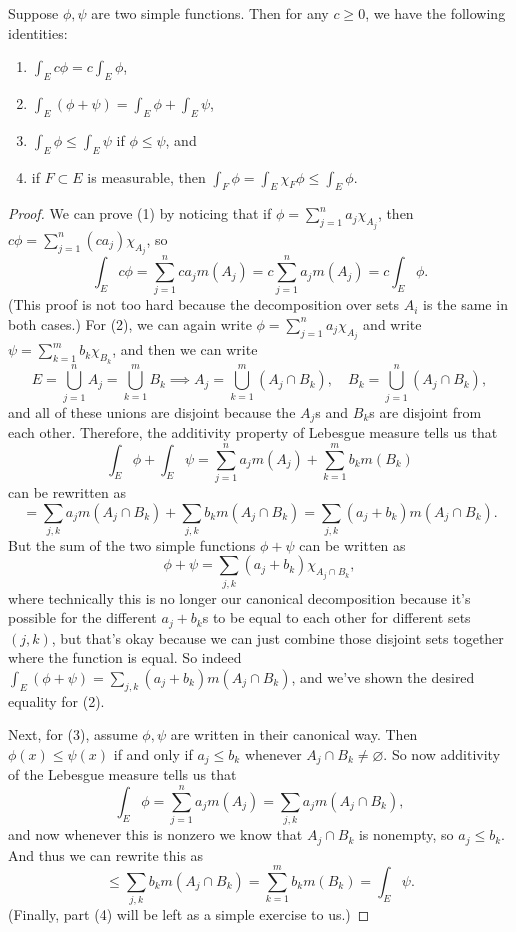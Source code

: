 \begin{theorem}
Suppose $\phi, \psi$ are two simple functions. Then for any $c \ge 0$, we have the following identities:
\begin{enumerate}
\item $\int_E c\phi = c \int_E \phi$,
\item $\int_E (\phi + \psi) = \int_E \phi + \int_E \psi$,
\item $\int_E \phi \le \int_E \psi$ if $\phi \le \psi$, and
\item if $F \subset E$ is measurable, then $\int_F \phi = \int_E \chi_F \phi \le \int_E \phi$.
\end{enumerate}
\end{theorem}
\begin{proof}
We can prove (1) by noticing that if $\phi = \sum_{j=1}^n a_j \chi_{A_j}$, then $c\phi = \sum_{j=1}^n (ca_j)\chi_{A_j}$, so 
\[
    \int_E c\phi = \sum_{j=1}^n ca_j m(A_j) = c \sum_{j=1}^n a_j m(A_j) = c \int_E \phi.
\]  
(This proof is not too hard because the decomposition over sets $A_i$ is the same in both cases.) For (2), we can again write $\phi = \sum_{j=1}^n a_j \chi_{A_j}$ and write $\psi = \sum_{k=1}^m b_k \chi_{B_k}$, and then we can write 
\[
    E = \bigcup_{j=1}^n A_j = \bigcup_{k=1}^m B_k \implies A_j = \bigcup_{k=1}^m (A_j \cap B_k), \quad B_k = \bigcup_{j=1}^n (A_j \cap B_k),
\]
and all of these unions are disjoint because the $A_j$s and $B_k$s are disjoint from each other. Therefore, the additivity property of Lebesgue measure tells us that 
\[
    \int_E \phi + \int_E \psi = \sum_{j=1}^n a_j m(A_j) + \sum_{k=1}^m b_k m(B_k)
\]
can be rewritten as 
\[
    = \sum_{j, k} a_j m(A_j \cap B_k) + \sum_{j, k} b_k m(A_j \cap B_k) = \sum_{j, k} (a_j + b_k) m(A_j \cap B_k).
\]
But the sum of the two simple functions $\phi + \psi$ can be written as 
\[
    \phi + \psi = \sum_{j, k} (a_j + b_k) \chi_{A_j \cap B_k},
\]
where technically this is no longer our canonical decomposition because it's possible for the different $a_j + b_k$s to be equal to each other for different sets $(j, k)$, but that's okay because we can just combine those disjoint sets together where the function is equal. So indeed $\int_E (\phi + \psi) = \sum_{j, k} (a_j + b_k) m(A_j \cap B_k)$, and we've shown the desired equality for (2). 

Next, for (3), assume $\phi, \psi$ are written in their canonical way. Then $\phi(x) \le \psi(x)$ if and only if $a_j \le b_k$ whenever $A_j \cap B_k \ne \varnothing$. So now additivity of the Lebesgue measure tells us that
\[
    \int_E \phi = \sum_{j=1}^n a_j m(A_j) = \sum_{j, k} a_j m(A_j \cap B_k),
\]
and now whenever this is nonzero we know that $A_j \cap B_k$ is nonempty, so $a_j \le b_k$. And thus we can rewrite this as 
\[
    \le \sum_{j, k} b_k m(A_j \cap B_k) = \sum_{k=1}^m b_k m(B_k) = \int_E \psi.
\]
(Finally, part (4) will be left as a simple exercise to us.)
\end{proof}

